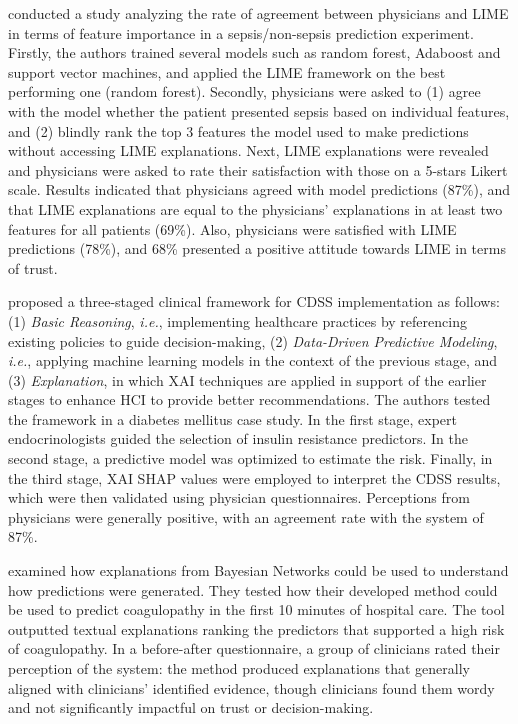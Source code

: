 \cite{kumarakulasinghe2020evaluating} conducted a study analyzing the rate of agreement between physicians and LIME in terms of feature importance in a sepsis/non-sepsis prediction experiment. Firstly, the authors trained several models such as random forest, Adaboost and support vector machines, and applied the LIME framework on the best performing one (random forest). Secondly, physicians were asked to (1) agree with the model whether the patient presented sepsis based on individual features, and (2) blindly rank the top 3 features the model used to make predictions without accessing LIME explanations. Next, LIME explanations were revealed and physicians were asked to rate their satisfaction with those on a 5-stars Likert scale. Results indicated that physicians agreed with model predictions (87\%), and that LIME explanations are equal to the physicians' explanations in at least two features for all patients (69\%). Also, physicians were satisfied with LIME predictions (78\%), and 68\% presented a positive attitude towards LIME in terms of trust. 


\cite{kovalchuk2022three} proposed a three-staged clinical framework for CDSS implementation as follows: (1) \textit{Basic Reasoning}, \textit{i.e.}, implementing healthcare practices by referencing existing policies to guide decision-making, (2) \textit{Data-Driven Predictive Modeling}, \textit{i.e.}, applying machine learning models in the context of the previous stage, and (3) \textit{Explanation}, in which XAI techniques are applied in support of the earlier stages to enhance HCI to provide better recommendations. 
The authors tested the framework in a diabetes mellitus case study. In the first stage, expert endocrinologists guided the selection of insulin resistance predictors. In the second stage, a predictive model was optimized to estimate the risk. Finally, in the third stage, XAI SHAP values were employed to interpret the CDSS results, which were then validated using physician questionnaires. Perceptions from physicians were generally positive, with an agreement rate with the system of 87\%. 



\cite{kyrimi2020incremental} examined how explanations from Bayesian Networks could be used to understand how predictions were generated. They tested how their developed method could be used to predict coagulopathy in the first 10 minutes of hospital care. The tool outputted textual explanations ranking the predictors that supported a high risk of coagulopathy. In a before-after questionnaire, a group of clinicians rated their perception of the system: the method produced explanations that generally aligned with clinicians' identified evidence, though clinicians found them wordy and not significantly impactful on trust or decision-making.



